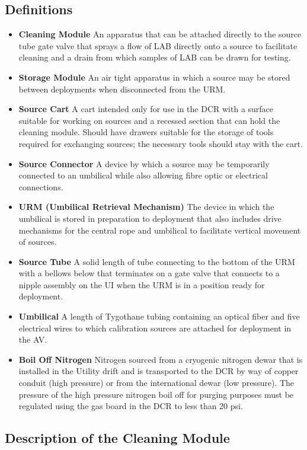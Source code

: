 \subsection{Definitions}
\begin{itemize}
\item {\bf Cleaning Module} An apparatus that can be attached directly to the source tube gate valve that sprays a flow of LAB directly onto a source to facilitate cleaning and a drain from which samples of LAB can be drawn for testing.
\item {\bf Storage Module} An air tight apparatus in which a source may be stored between deployments when disconnected from the URM.
\item {\bf Source Cart} A cart intended only for use in the DCR with a surface suitable for working on sources and a recessed section that can hold the cleaning module. Should have drawers suitable for the storage of tools required for exchanging sources; the necessary tools should stay with the cart. 
\item {\bf Source Connector} A device by which a source may be temporarily connected to an umbilical while also allowing fibre optic or electrical connections.
\item {\bf URM (Umbilical Retrieval Mechanism)} The device in which the umbilical is stored in preparation to deployment that also includes drive mechanisms for the central rope and umbilical to facilitate vertical movement of sources.
\item {\bf Source Tube} A solid length of tube connecting to the bottom of the URM with a bellows below that terminates on a gate valve that connects to a nipple  assembly on the UI when the URM is in a position ready for deployment. 
\item {\bf Umbilical} A length of Tygothane tubing containing an optical fiber and five electrical wires to which calibration sources are attached for deployment in the AV.
\item {\bf Boil Off Nitrogen} Nitrogen sourced from a cryogenic nitrogen dewar that is installed in the Utility drift and is transported to the DCR by way of copper conduit (high pressure) or from the international dewar (low pressure). The pressure of the high pressure nitrogen boil off for purging purposes must be regulated using the gas board in the DCR to less than 20 psi.
\end{itemize}

\subsection{Description of the Cleaning Module}

